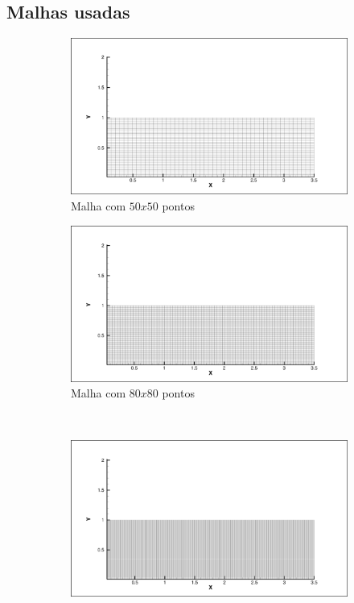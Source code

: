 \documentclass[a4paper, twoside, 12pt]{article}
\numberwithin{equation}{section}
\begin{document}
    \subsection{Malhas usadas}
        \begin{figure}[H]

        \begin{subfigure}{.5\textwidth}
        \centering
        \includegraphics[width=.9\linewidth]{pics/mesh_5050.png}
        \caption{Malha com $50x50$ pontos}
        \label{fig:sfig1}
        \end{subfigure}%
        \begin{subfigure}{.5\textwidth}
        \centering
        \includegraphics[width=.9\linewidth]{pics/mesh_8080.png}
        \caption{Malha com $80x80$ pontos}
        \label{fig:sfig2}
        \end{subfigure}
        \\
        \begin{subfigure}{.5\textwidth}
        \centering
        \includegraphics[width=.9\linewidth]{pics/mesh_110110.png}

\end{subfigure}
\end{figure}
\end{document}
